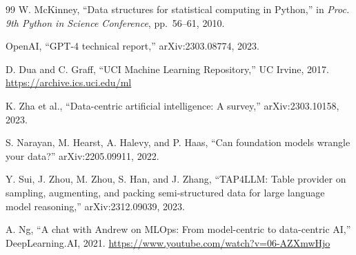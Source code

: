 \documentclass[11pt]{article}
\begin{document}
\begin{thebibliography}{99}
W. McKinney,
``Data structures for statistical computing in Python,''
in \textit{Proc. 9th Python in Science Conference}, pp.~56--61, 2010.

OpenAI,
``GPT-4 technical report,''
arXiv:2303.08774, 2023.

D. Dua and C. Graff,
``UCI Machine Learning Repository,''
UC Irvine, 2017. \url{https://archive.ics.uci.edu/ml}

K. Zha et al.,
``Data-centric artificial intelligence: A survey,''
arXiv:2303.10158, 2023.

S. Narayan, M. Hearst, A. Halevy, and P. Haas,
``Can foundation models wrangle your data?''
arXiv:2205.09911, 2022.

Y. Sui, J. Zhou, M. Zhou, S. Han, and J. Zhang,
``TAP4LLM: Table provider on sampling, augmenting, and packing
  semi-structured data for large language model reasoning,''
arXiv:2312.09039, 2023.

A. Ng,
``A chat with Andrew on MLOps: From model-centric to data-centric AI,''
DeepLearning.AI, 2021.
\url{https://www.youtube.com/watch?v=06-AZXmwHjo}

\end{thebibliography}
\end{document}
